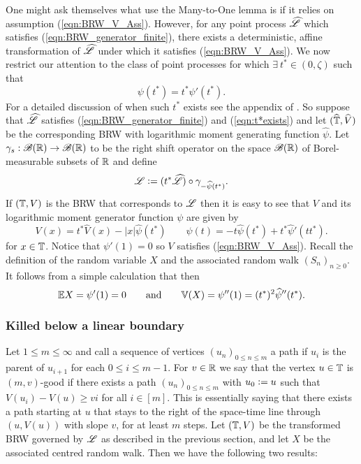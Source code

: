 One might ask themselves what use the Many-to-One lemma is if it relies on assumption (\ref{eqn:BRW_V_Ass}). However, for any point process $\widehat{\mathscr{L}}$ which satisfies (\ref{eqn:BRW_generator_finite}), there exists a deterministic, affine transformation of $\widehat{\mathscr{L}}$ under which it satisfies (\ref{eqn:BRW_V_Ass}). We now restrict our attention to the class of point processes for which $\exists\ t^* \in (0, \zeta)$ such that
\begin{equation}\label{eqn:t*exists}
\psi (t^*) = t^* \psi'(t^*). 
\end{equation}
For a detailed discussion of when such $t^*$ exists see the appendix of \cite{jaffuel2227critical}. So suppose that $\widehat{\mathscr{L}}$ satisfies (\ref{eqn:BRW_generator_finite}) and (\ref{eqn:t*exists}) and let $(\widehat{\mathbb{T}}, \widehat{V})$ be the corresponding BRW with logarithmic moment generating function $\widehat{\psi}$. Let $\gamma_s : \mathscr{B}(\mathbb{R}) \to \mathscr{B}(\mathbb{R})$ to be the right shift operator on the space $\mathscr{B}(\mathbb{R})$ of Borel-measurable subsets of $\mathbb{R}$ and define
\begin{equation}\label{eqn:transformation}
\mathscr{L} \vcentcolon= (t^* \widehat{\mathscr{L}}) \circ \gamma_{- \widehat{\psi}(t^*)}. 
\end{equation}
If $(\mathbb{T}, V)$ is the BRW that corresponds to $\mathscr{L}$ then it is easy to see that $V$ and its logarithmic moment generator function $\psi$ are given by 
\begin{equation}
V(x) = t^* \widehat{V}(x) - |x| \widehat{\psi}(t^*) \qquad \psi(t) = -t \widehat{\psi}(t^*) + t^* \widehat{\psi}'(t t^*). 
\end{equation}
for $x \in \mathbb{T}$. Notice that $\psi'(1) = 0$ so $V$ satisfies (\ref{eqn:BRW_V_Ass}). Recall the definition of the random variable $X$ and the associated random walk $(S_n)_{n \geq 0}$. It follows from a simple calculation that then 
\begin{equation}
\mathbb{E}{X} = \psi'(1) = 0 \qquad\text{and}\qquad \mathbb{V}(X) = \psi''(1) = (t^*)^2 \widehat{\psi}''(t^*). 
\end{equation}





\subsubsection{Killed below a linear boundary}

Let $1 \leq m \leq \infty$ and call a sequence of vertices $(u_n)_{0 \leq n \leq m}$ a path if $u_i$ is the parent of $u_{i+1}$ for each $0 \leq i \leq m-1$. For $v \in \mathbb{R}$ we say that the vertex $u \in \mathbb{T}$ is $(m, v)$-good if there exists a path $(u_n)_{0 \leq n \leq m}$ with $u_0 \vcentcolon= u$ such that $V(u_i) - V(u) \geq vi$ for all $i \in [m]$. This is essentially saying that there exists a path starting at $u$ that stays to the right of the space-time line through $(u, V(u))$ with slope $v$, for at least $m$ steps. Let $(\mathbb{T}, V)$ be the transformed BRW governed by $\mathscr{L}$ as described in the previous section, and let $X$ be the associated centred random walk. Then we have the following two results: \\

